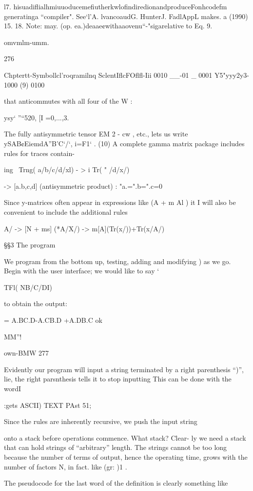  

l7. hisuadiﬂialhmiuuoducemeﬁutherkwlofindiredionandproduceFonhcodefm
generatinga “compiler". See‘l'A. lvancoaudG. HunterJ. FadlAppL makes. a (1990) 15.
18. Note: may. (op. ea.)deaae¢withaaovenu“-"sigarelative to Eq. 9.

omvmlm-umm.

276

Chptertt-Symbollcl’roqramilnq SclentIﬂcFOﬂﬂ-Iii
0010
__-01 _ 0001
Y5"yyy2y3- 1000 (9)
0100

that anticommutes with all four of the W :

ysy‘ ”“520, [I =0,...,3.

The fully antisymmetric tensor EM 2 - cw , etc., lets us write
ySAB¢EiemdA”B’C‘/‘, i=F1‘ . (10)
A complete gamma matrix package includes rules for traces contain-

ing
\ Trng( a/b/c/d/xl) - > i Tr( " /d/x/)

-> [a.b,c,d] (antisymmetric product)
\Note: "a.=".b=".c=0

 

Since y-matrices often appear in expressions like (A + m Al ) it I
will also be convenient to include the additional rules

\*A/ -> [N + ms]
\Tr(*A/X/) -> m[A](Tr(x/))+Tr(x/A/)

§§3 The program

We program from the bottom up, testing, adding and modifying )
as we go. Begin with the user interface; we would like to say ‘

TFl( NB/C/DI)

to obtain the output:

= A.BC.D-A.CB.D +A.DB.C ok

MM”!

own-BMW 277

Evidently our program will input a string terminated by a right
parenthesis “)”, lie, the right parsnthesis tells it to stop inputting
This can be done with the wordI

:gets ASCII) TEXT PAst 51;

Since the rules are inherently recursive, we push the input string

onto a stack before operations commence. What stack? Clear-
ly we need a stack that can hold strings of “arbitrary” length. The
strings cannot be too long because the number of terms of output,
hence the operating time, grows with the number of factors N, in
fact. like (gr: )1 .

The pseudocode for the last word of the deﬁnition is clearly
something like

